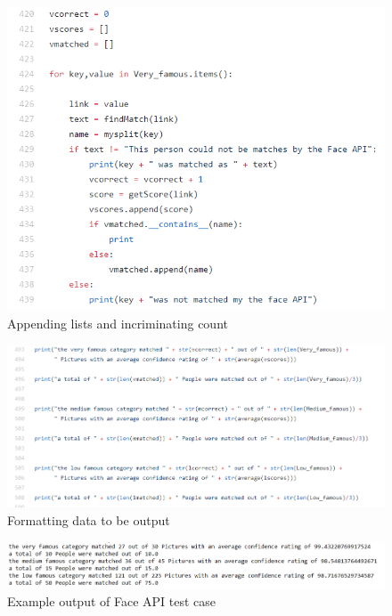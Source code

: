 \documentclass[12pt,a4paper]{article}
\begin{document}
\begin{figure}[h]
    \centering
    \includegraphics[width=1.0\textwidth]{Figs/faceevalcode2.PNG} 
    \caption{Appending lists and incriminating count} 
    \label{fec2}
\end{figure} 

\begin{figure}[h]
    \centering
    \includegraphics[width=1.0\textwidth]{Figs/faceevalcode3.PNG} 
    \caption{Formatting data to be output} 
    \label{fec3}
\end{figure} 

\begin{figure}[h]
    \centering
    \includegraphics[width=1.0\textwidth]{Figs/faceevaloutput.PNG} 
    \caption{Example output of Face API test case} 
    \label{feo}
\end{figure} 
\end{document}
